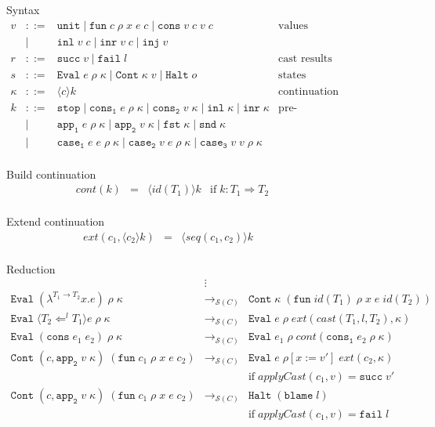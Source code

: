 \documentclass[acmsmall,review,anonymous]{acmart}\settopmatter{printfolios=true,printccs=false,printacmref=false}
\newcommand{\stxrule}[3]{#1 & ::= & #3 & \text{#2}\\}
\newcommand{\stxrulecont}[1]{& | & #1 & \\}
\newcommand{\funrule}[3]{#1 &=& #2 & #3\\}
\newcommand{\sOOinspect}[3]{\mathtt{Eval} \; #1 \; #2 \; #3}
\newcommand{\sOOreturn}[2]{\mathtt{Cont} \; #2 \; #1}
\newcommand{\sOOhalt}[1]{\mathtt{Halt} \; #1}
\newcommand{\eOOlam}[4]{\lambda^{#1\rightarrow{}#2}#3.#4}
\newcommand{\eOOcons}[2]{\mathtt{cons} \; #1 \; #2}
\newcommand{\eOOcast}[4]{\langle \cOOcast{#2}{#3}{#4} \rangle #1}
\newcommand{\oOOblame}[1]{\mathtt{blame} \; #1}
\newcommand{\cOOcast}[3]{#3 \Leftarrow^{#2} #1}
\newcommand{\rOOsucc}[1]{\mathtt{succ}\;#1}
\newcommand{\rOOfail}[1]{\mathtt{fail}\;#1}
\newcommand{\hcvOOinj}[2]{\mathtt{inj} \; #2}
\newcommand{\hcvOOfun}[5]{\mathtt{fun} \; #1 \; #2 \; #3 \; #4 \; #5}
\newcommand{\hcvOOtt}[0]{\mathtt{unit}}
\newcommand{\hcvOOcons}[4]{\mathtt{cons}\;#1\;#2\;#3\;#4}
\newcommand{\hcvOOinl}[2]{\mathtt{inl}\;#1\;#2}
\newcommand{\hcvOOinr}[2]{\mathtt{inr}\;#1\;#2}
\newcommand{\hckOOmt}[0]{\mathtt{stop}}
\newcommand{\hckOOconsI}[3]{\mathtt{cons_1}\;#1\;#2\;#3}
\newcommand{\hckOOappII}[2]{\mathtt{app_2}\;#1\;#2}
\newcommand{\sidecond}[1]{\text{if}\;#1}
\newcommand{\judgeSreduce}[3]{#2 \longrightarrow_{\mathcal{S}(#1)} #3}
\newcommand{\redruleS}[3]{#1 & \longrightarrow_{\mathcal{S}(C)} & #2 & #3\\}
\begin{document}
\begin{figure}
	Syntax
	\[
	\begin{array}{rclr}
	
	\stxrule{v}{values}{
		\hcvOOtt \mid
		\hcvOOfun{c}{\rho}{x}{e}{c} \mid
		\hcvOOcons{v}{c}{v}{c}
	}
	\stxrulecont{
		\hcvOOinl{v}{c} \mid
		\hcvOOinr{v}{c} \mid
		\hcvOOinj{P}{v}
	}
	\stxrule{r}{cast results}{
		\rOOsucc{v} \mid
		\rOOfail{l}
	}
	\stxrule{s}{states}{
		\sOOinspect{e}{\rho}{\kappa} \mid{}
		\sOOreturn{v}{\kappa} \mid{}
		\sOOhalt{o}
	}
	\stxrule{\kappa}{continuation}{
		\langle c \rangle k
	}
	\stxrule{k}{pre-continuations}{
		\hckOOmt \mid{}
		\mathtt{cons_1} \; e \; \rho \; \kappa \mid{}
		\mathtt{cons_2} \; v \; \kappa \mid{}
		\mathtt{inl} \; \kappa \mid{}
		\mathtt{inr} \; \kappa
	}
	\stxrulecont{
		\mathtt{app_1} \; e \; \rho \; \kappa \mid{}
		\mathtt{app_2} \; v \; \kappa \mid{}
		\mathtt{fst} \; \kappa \mid{}
		\mathtt{snd} \; \kappa
	}
	\stxrulecont{
		\mathtt{case_1} \; e \; e \; \rho \; \kappa \mid
		\mathtt{case_2} \; v \; e \; \rho \; \kappa \mid{}
		\mathtt{case_3} \; v \; v \; \rho \; \kappa
	}
	\end{array}
	\]
	
	Build continuation 
	\[
	\begin{array}{rclc}
	\funrule{cont(k)}{\langle id(T_1) \rangle k}{
		\sidecond{k : T_1 \Longrightarrow T_2}}
	\end{array}
	\]
	
	Extend continuation 
	\[
	\begin{array}{rclc}
	\funrule{ext(c_1,\langle c_2 \rangle k)}{\langle seq(c_1,c_2) \rangle k}{}
	\end{array}
	\]
	
	Reduction \fbox{$ \judgeSreduce{C}{s}{s} $}
	\[
	\begin{array}{rclr}
	& \vdots \\
	\redruleS{
		\sOOinspect{(\eOOlam{T_1}{T_2}{x}{e})}{\rho}{\kappa}
	}{
		\sOOreturn{(\hcvOOfun{id(T_1)}{\rho}{x}{e}{id(T_2)})}{\kappa}
	}{}
	\redruleS{
		\sOOinspect{\eOOcast{e}{T_1}{l}{T_2}}{\rho}{\kappa}
	}{
		\sOOinspect{e}{\rho}{ext(cast(T_1,l,T_2),\kappa)}
	}{}
	\redruleS{
		\sOOinspect{(\eOOcons{e_1}{e_2})}{\rho}{\kappa}
	}{
		\sOOinspect{e_1}{\rho}{cont(\hckOOconsI{e_2}{\rho}{\kappa})}
	}{}
	\redruleS{
		\sOOreturn{(\hcvOOfun{c_1}{\rho}{x}{e}{c_2})}{(c,\hckOOappII{v}{\kappa})}
	}{
		\sOOinspect{e}{\rho[x:=v']}{ext(c_2,\kappa)}
	}{
		\\ & &
		\sidecond{applyCast(c_1,v) = \rOOsucc{v'}}
	}
	\redruleS{
		\sOOreturn{(\hcvOOfun{c_1}{\rho}{x}{e}{c_2})}{(c,\hckOOappII{v}{\kappa})}
	}{
		\sOOhalt{(\oOOblame{l})}
	}{
		\\ & &
		\sidecond{applyCast(c_1,v) = \rOOfail{l}}
	}
	\end{array}
	\]
	

\end{figure}
\end{document}
